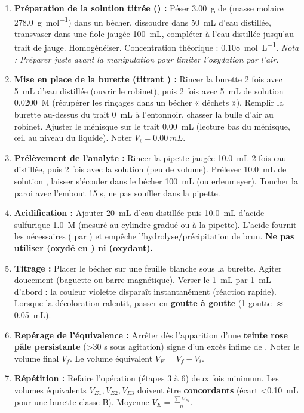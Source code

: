 \documentclass[11pt]{article}
\newcounter{popsec}
\newcounter{popsub}
\newcommand{\courssub}[1]{%
  \stepcounter{popsub}%
  \par\vspace{9pt}\noindent{\popxbold\fontsize{11.5}{13}\selectfont\color{popink}{\color{poporange}\thepopsec.\thepopsub}\hspace{6pt}#1}\par\nopagebreak\vspace{4pt}
}
\begin{document}
\courssub{Protocole}
\begin{enumerate}
    \item \textbf{Préparation de la solution titrée () :} Péser \SI{3,00}{g} de  (masse molaire \SI{278,0}{g.mol^{-1}}) dans un bécher, dissoudre dans \SI{50}{mL} d'eau distillée, transvaser dans une fiole jaugée \SI{100}{mL}, compléter à l'eau distillée jusqu'au trait de jauge. Homogénéiser. Concentration théorique : \SI{0,108}{mol.L^{-1}}. \emph{Nota : Préparer juste avant la manipulation pour limiter l'oxydation par l'air.}
    \item \textbf{Mise en place de la burette (titrant ) :} Rincer la burette 2 fois avec \SI{5}{mL} d'eau distillée (ouvrir le robinet), puis 2 fois avec \SI{5}{mL} de solution  \SI{0,0200}{M} (récupérer les rinçages dans un bécher « déchets »). Remplir la burette au-dessus du trait \SI{0}{mL} à l'entonnoir, chasser la bulle d'air au robinet. Ajuster le ménisque sur le trait \SI{0,00}{mL} (lecture bas du ménisque, œil au niveau du liquide). Noter $V_i = \SI{0,00}{mL}$.
    \item \textbf{Prélèvement de l'analyte :} Rincer la pipette jaugée \SI{10,0}{mL} 2 fois eau distillée, puis 2 fois avec la solution  (peu de volume). Prélever \SI{10,0}{mL} de solution , laisser s'écouler dans le bécher \SI{100}{mL} (ou erlenmeyer). Toucher la paroi avec l'embout 15 s, ne pas souffler dans la pipette.
    \item \textbf{Acidification :} Ajouter \SI{20}{mL} d'eau distillée puis \SI{10,0}{mL} d'acide sulfurique  \SI{1,0}{M} (mesuré au cylindre gradué ou à la pipette). L'acide fournit les  nécessaires ( par ) et empêche l'hydrolyse/précipitation de  brun. \textbf{Ne pas utiliser  (oxydé en ) ni  (oxydant).}
    \item \textbf{Titrage :} Placer le bécher sur une feuille blanche sous la burette. Agiter doucement (baguette ou barre magnétique). Verser le  \SI{1}{mL} par \SI{1}{mL} d'abord : la couleur violette disparaît instantanément (réaction rapide). Lorsque la décoloration ralentit, passer en \textbf{goutte à goutte} (1 goutte $\approx$ \SI{0,05}{mL}).
    \item \textbf{Repérage de l'équivalence :} Arrêter dès l'apparition d'une \textbf{teinte rose pâle persistante} (\textgreater 30 s sous agitation) signe d'un excès infime de . Noter le volume final $V_f$. Le volume équivalent $V_E = V_f - V_i$.
    \item \textbf{Répétition :} Refaire l'opération (étapes 3 à 6) deux fois minimum. Les volumes équivalents $V_{E1}, V_{E2}, V_{E3}$ doivent être \textbf{concordants} (écart \textless \SI{0,10}{mL} pour une burette classe B). Moyenne $V_E = \frac{\sum V_{Ei}}{n}$.
\end{enumerate}
\end{document}
